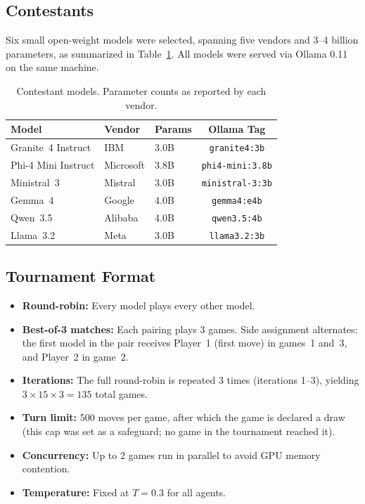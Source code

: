 \documentclass[11pt]{article}
\begin{document}
\subsection{Contestants}

Six small open-weight models were selected, spanning five vendors and 3--4 billion parameters, as summarized in Table~\ref{tab:models}. All models were served via Ollama 0.11 on the same machine.

\begin{table}[H]
\centering
\caption{Contestant models. Parameter counts as reported by each vendor.}
\label{tab:models}
\begin{tabular}{lllc}
\toprule
\textbf{Model} & \textbf{Vendor} & \textbf{Params} & \textbf{Ollama Tag} \\
\midrule
Granite~4 Instruct         & IBM       & 3.0B & \texttt{granite4:3b} \\
Phi-4 Mini Instruct        & Microsoft & 3.8B & \texttt{phi4-mini:3.8b} \\
Ministral~3                & Mistral   & 3.0B & \texttt{ministral-3:3b} \\
Gemma~4                    & Google    & 4.0B & \texttt{gemma4:e4b} \\
Qwen~3.5                   & Alibaba   & 4.0B & \texttt{qwen3.5:4b} \\
Llama~3.2                  & Meta      & 3.0B & \texttt{llama3.2:3b} \\
\bottomrule
\end{tabular}
\end{table}

\subsection{Tournament Format}

\begin{itemize}[nosep]
\item \textbf{Round-robin:} Every model plays every other model.
\item \textbf{Best-of-3 matches:} Each pairing plays 3 games. Side assignment alternates: the first model in the pair receives Player~1 (first move) in games~1 and~3, and Player~2 in game~2.
\item \textbf{Iterations:} The full round-robin is repeated 3 times (iterations 1--3), yielding $3 \times 15 \times 3 = 135$ total games.
\item \textbf{Turn limit:} 500 moves per game, after which the game is declared a draw (this cap was set as a safeguard; no game in the tournament reached it).
\item \textbf{Concurrency:} Up to 2 games run in parallel to avoid GPU memory contention.
\item \textbf{Temperature:} Fixed at $T = 0.3$ for all agents.
\end{itemize}
\end{document}
